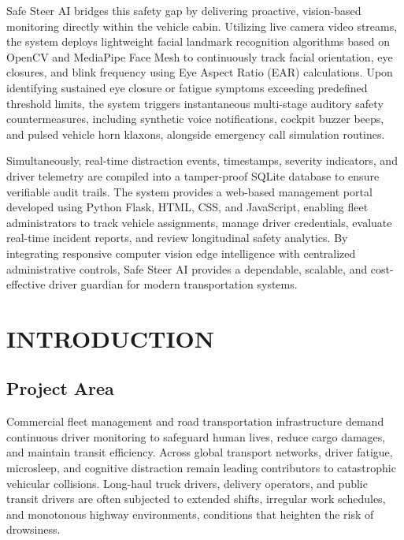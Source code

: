 \documentclass[a4paper,12pt]{report}
\let\mtcontentsname\contentsname
\renewcommand\contentsname{\MakeUppercase\mtcontentsname}
\begin{document}
Safe Steer AI bridges this safety gap by delivering proactive, vision-based monitoring directly within the vehicle cabin. Utilizing live camera video streams, the system deploys lightweight facial landmark recognition algorithms based on OpenCV and MediaPipe Face Mesh to continuously track facial orientation, eye closures, and blink frequency using Eye Aspect Ratio (EAR) calculations. Upon identifying sustained eye closure or fatigue symptoms exceeding predefined threshold limits, the system triggers instantaneous multi-stage auditory safety countermeasures, including synthetic voice notifications, cockpit buzzer beeps, and pulsed vehicle horn klaxons, alongside emergency call simulation routines. 

Simultaneously, real-time distraction events, timestamps, severity indicators, and driver telemetry are compiled into a tamper-proof SQLite database to ensure verifiable audit trails. The system provides a web-based management portal developed using Python Flask, HTML, CSS, and JavaScript, enabling fleet administrators to track vehicle assignments, manage driver credentials, evaluate real-time incident reports, and review longitudinal safety analytics. By integrating responsive computer vision edge intelligence with centralized administrative controls, Safe Steer AI provides a dependable, scalable, and cost-effective driver guardian for modern transportation systems.

\vspace{0.5cm}
\clearpage

\tableofcontents
\renewcommand*\contentsname{CONTENTS}

\newpage
\renewcommand{\listfigurename}{LIST OF FIGURES}
\listoffigures
{}

\newpage
\renewcommand{\listtablename}{LIST OF TABLES}
\listoftables
{}

\clearpage

\renewcommand{\chaptername}{CHAPTER}
\chapter{INTRODUCTION}

\section{Project Area}
\par
Commercial fleet management and road transportation infrastructure demand continuous driver monitoring to safeguard human lives, reduce cargo damages, and maintain transit efficiency. Across global transport networks, driver fatigue, microsleep, and cognitive distraction remain leading contributors to catastrophic vehicular collisions. Long-haul truck drivers, delivery operators, and public transit drivers are often subjected to extended shifts, irregular work schedules, and monotonous highway environments, conditions that heighten the risk of drowsiness.
\end{document}
